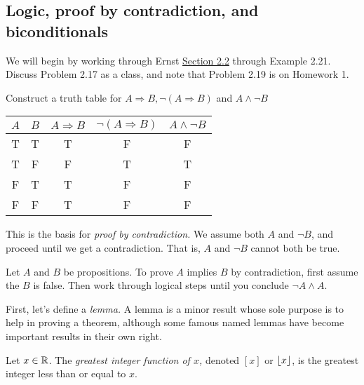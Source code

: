 \documentclass{ximera}
\begin{document}
\subsection{Logic, proof by contradiction, and biconditionals}%

We will begin by working through Ernst \href{https://danaernst.com/IBL-IntroToProof/pretext/sec_Intro_to_Logic.html}{Section 2.2} through Example 2.21. Discuss Problem 2.17 as a class, and note that Problem 2.19 is on Homework 1.



\begin{br}
 Construct a truth table for $A\Rightarrow B, \neg (A\Rightarrow B)$ and $A\land \neg B$
\end{br}
\begin{solution}
 
\begin{tabular}{c|c|c|c|c}
 $A$ 	& $B$	& $A\Rightarrow B$ 	& $\neg (A\Rightarrow B)$ & $A\land \neg B$\\\hline
  T 	& T		& T 				& F					& F	\\
  T 	& F 		& F 				& T					& T\\
  F 	& T 		& T 				& F					& F\\
  F 	& F 		& T 				& F					& F\\
\end{tabular}
\end{solution}

This is the basis for \emph{proof by contradiction.} We assume both $A$ and $\neg B$, and proceed until we get a contradiction. That is, $A$ and $\neg B$ cannot both be true.

\begin{defn}\label{proof-contradiction}
 Let $A$ and $B$ be propositions. To prove $A$ implies $B$ by contradiction, first assume the $B$ is false. Then work through logical steps until you conclude $\neg A \land A$.
\end{defn}

First, let's define a \emph{lemma.} A lemma is a minor result whose sole purpose is to help in proving a theorem, although some famous named lemmas have become important results in their own right.

\begin{defn}\label{defn:floor}
 Let $x\in\mathbb R$. The \emph{greatest integer function of $x$,} denoted $[x]$ or $\left\lfloor x\right\rfloor$, is the greatest integer less than or equal to $x$.
\end{defn}
\end{document}
